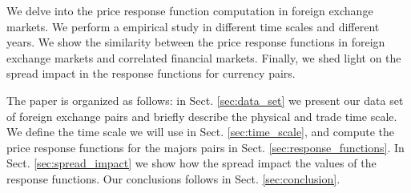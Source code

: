 We delve into the price response function computation in foreign exchange
markets. We perform a empirical study in different time scales and different
years. We show the similarity between the price response functions in foreign
exchange markets and correlated financial markets. Finally, we shed light on
the spread impact in the response functions for currency pairs.

The paper is organized as follows: in Sect. \ref{sec:data_set} we present our
data set of foreign exchange pairs and briefly describe the physical and trade
time scale. We define the time scale we will use in Sect. \ref{sec:time_scale},
and compute the price response functions for the majors pairs in Sect.
\ref{sec:response_functions}. In Sect. \ref{sec:spread_impact} we show how
the spread impact the values of the response functions. Our conclusions follows
in Sect. \ref{sec:conclusion}.